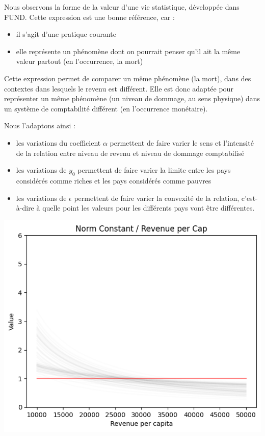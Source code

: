 \begin{methodbox}
Nous observons la forme de la valeur d'une vie statistique, développée dans FUND. Cette expression est une bonne référence, car : 

\begin{itemize}
    \item il s'agit d'une pratique courante
    \item elle représente un phénomène dont on pourrait penser qu'il ait la même valeur partout (en l'occurrence, la mort)
\end{itemize}

Cette expression permet de comparer un même phénomène (la mort), dans des contextes dans lesquels le revenu est différent. Elle est donc adaptée pour représenter un même phénomène (un niveau de dommage, au sens physique) dans un système de comptabilité différent (en l'occurrence monétaire). 

Nous l'adaptons ainsi : 

\begin{itemize}
    \item les variations du coefficient $\alpha$ permettent de faire varier le sens et l'intensité de la relation entre niveau de revenu et niveau de dommage comptabilisé
    \item les variations de $y_0$ permettent de faire varier la limite entre les pays considérés comme riches et les pays considérés comme pauvres
    \item les variations de $\epsilon$ permettent de faire varier la convexité de la relation, c'est-à-dire à quelle point les valeurs pour les différents pays vont être différentes. 
\end{itemize}

\vspace{2cm}

\centering
\includegraphics[width=0.75\linewidth]{figures/coef.png}

\end{methodbox}
\begin{methodbox}


    
\end{methodbox}

